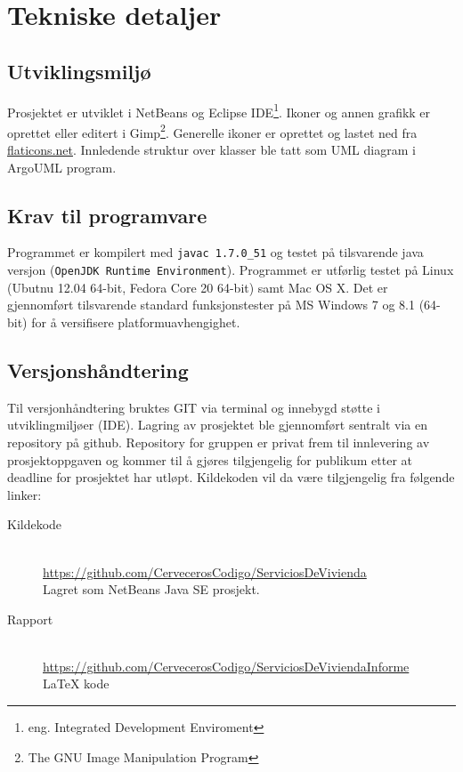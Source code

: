 \section{Tekniske detaljer}

\subsection{Utviklingsmiljø}
Prosjektet er utviklet i NetBeans og Eclipse IDE\footnote{eng. Integrated Development Enviroment}. Ikoner og annen grafikk er oprettet eller editert i Gimp\footnote{The GNU Image Manipulation Program}. Generelle ikoner er oprettet og lastet ned fra \href{http://www.flaticons.net}{flaticons.net}. Innledende struktur over klasser ble tatt som UML diagram i ArgoUML program.

\subsection{Krav til programvare}
Programmet er kompilert med \texttt{javac 1.7.0\_51} og testet på tilsvarende java versjon (\texttt{OpenJDK Runtime Environment}). Programmet er utførlig testet på Linux (Ubutnu 12.04 64-bit, Fedora Core 20 64-bit) samt Mac OS X. Det er gjennomført tilsvarende standard funksjonstester på MS Windows 7 og 8.1 (64-bit) for å versifisere platformuavhengighet. 

\subsection{Versjonshåndtering}
Til versjonhåndtering bruktes GIT via terminal og innebygd støtte i utviklingmiljøer (IDE). Lagring av prosjektet ble gjennomført sentralt via en repository på github. Repository for gruppen er privat frem til innlevering av prosjektoppgaven og kommer til å gjøres tilgjengelig for publikum etter at deadline for prosjektet har utløpt. Kildekoden vil da være tilgjengelig fra følgende linker:

\begin{description}
\item[Kildekode]
\hfill \\
\url{https://github.com/CervecerosCodigo/ServiciosDeVivienda}
\\Lagret som NetBeans Java SE prosjekt.

\item[Rapport]
\hfill \\
\url{https://github.com/CervecerosCodigo/ServiciosDeViviendaInforme}
\\ \LaTeX{} kode
\end{description}
